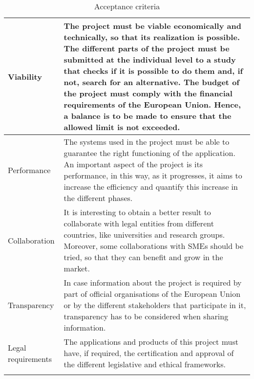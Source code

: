 \begin{longtable}[H]{lp{10.2cm}}
	Viability & The project must be viable economically and technically, so that its realization is possible. \newline
	The different parts of the project must be submitted at the individual level to a study that checks if it is possible to do them and, if not, search for an alternative. \newline
	The budget of the project must comply with the financial requirements of the European Union. Hence, a balance is to be made to ensure that the allowed limit is not exceeded. \vspace{0.2cm}
	\\ \midrule
	
	Performance & The systems used in the project must be able to guarantee the right functioning of the application. An important aspect of the project is its performance, in this way, as it progresses, it aims to increase the efficiency and quantify this increase in the different phases. \vspace{0.2cm}
	\\ \midrule
	
	Collaboration & It is interesting to obtain a better result to collaborate with legal entities from different countries, like universities and research groups. Moreover, some collaborations with SMEs should be tried, so that they can benefit and grow in the market. \vspace{0.2cm}	
	\\ \midrule
	
	Transparency & In case information about the project is required by part of official organisations of the European Union or by the different stakeholders that participate in it, transparency has to be considered when sharing information. \vspace{0.2cm}
	\\ \midrule


	Legal requirements & The applications and products of this project must have, if required, the certification and approval of the different legislative and ethical frameworks. \vspace{0.2cm}
	\\ \bottomrule[2pt]
	
	\caption{Acceptance criteria}

\end{longtable}


